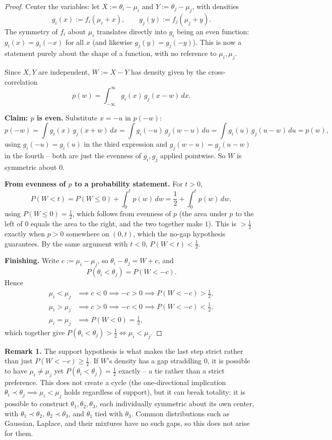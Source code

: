 \documentclass[11pt]{article}
\begin{document}
\begin{proof}
Center the variables: let $X := \theta_i - \mu_i$ and $Y := \theta_j - \mu_j$, with densities
\[
g_i(x) := f_i(\mu_i + x), \qquad g_j(y) := f_j(\mu_j + y).
\]
The symmetry of $f_i$ about $\mu_i$ translates directly into $g_i$ being an even function: $g_i(x) = g_i(-x)$ for all $x$ (and likewise $g_j(y) = g_j(-y)$). This is now a statement purely about the shape of a function, with no reference to $\mu_i, \mu_j$.

Since $X, Y$ are independent, $W := X - Y$ has density given by the cross-correlation
\[
p(w) = \int_{-\infty}^{\infty} g_i(x)\, g_j(x - w)\, dx.
\]

\textbf{Claim: $p$ is even.} Substitute $x = -u$ in $p(-w)$:
\[
p(-w) = \int g_i(x)\, g_j(x + w)\, dx = \int g_i(-u)\, g_j(w - u)\, du = \int g_i(u)\, g_j(u - w)\, du = p(w),
\]
using $g_i(-u) = g_i(u)$ in the third expression and $g_j(w - u) = g_j(u - w)$ in the fourth -- both are just the evenness of $g_i, g_j$ applied pointwise. So $W$ is symmetric about $0$.

\textbf{From evenness of $p$ to a probability statement.} For $t > 0$,
\[
P(W < t) = P(W \leq 0) + \int_0^t p(w)\, dw = \frac{1}{2} + \int_0^t p(w)\, dw,
\]
using $P(W \leq 0) = \frac{1}{2}$, which follows from evenness of $p$ (the area under $p$ to the left of $0$ equals the area to the right, and the two together make $1$). This is $> \frac{1}{2}$ exactly when $p > 0$ somewhere on $(0, t)$, which the no-gap hypothesis guarantees. By the same argument with $t < 0$, $P(W < t) < \frac{1}{2}$.

\textbf{Finishing.} Write $c := \mu_i - \mu_j$, so $\theta_i - \theta_j = W + c$, and
\[
P(\theta_i < \theta_j) = P(W < -c).
\]
Hence
\begin{align*}
\mu_i < \mu_j &\implies c < 0 \implies -c > 0 \implies P(W < -c) > \tfrac{1}{2}, \\
\mu_i > \mu_j &\implies c > 0 \implies -c < 0 \implies P(W < -c) < \tfrac{1}{2}, \\
\mu_i = \mu_j &\implies P(W < 0) = \tfrac{1}{2},
\end{align*}
which together give $P(\theta_i < \theta_j) > \frac{1}{2} \iff \mu_i < \mu_j$.
\end{proof}

\textbf{Remark 1.} The support hypothesis is what makes the last step strict rather than just $P(W < -c) \geq \frac{1}{2}$. If $W$'s density has a gap straddling $0$, it is possible to have $\mu_i \neq \mu_j$ yet $P(\theta_i < \theta_j) = \frac{1}{2}$ exactly -- a tie rather than a strict preference. This does not create a cycle (the one-directional implication $\theta_i \prec \theta_j \implies \mu_i < \mu_j$ holds regardless of support), but it can break totality: it is possible to construct $\theta_1, \theta_2, \theta_3$, each individually symmetric about its own center, with $\theta_1 \prec \theta_2$, $\theta_2 \prec \theta_3$, and $\theta_1$ tied with $\theta_3$. Common distributions such as Gaussian, Laplace, and their mixtures have no such gaps, so this does not arise for them.
\end{document}
